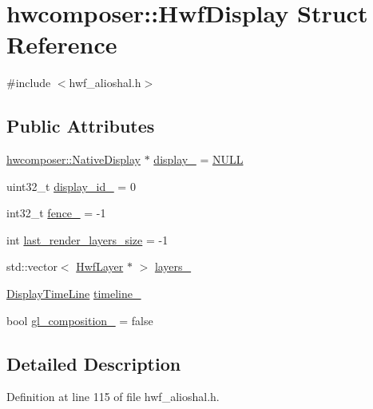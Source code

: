 \hypertarget{structhwcomposer_1_1HwfDisplay}{}\section{hwcomposer\+:\+:Hwf\+Display Struct Reference}
\label{structhwcomposer_1_1HwfDisplay}


{\ttfamily \#include $<$hwf\+\_\+alioshal.\+h$>$}

\subsection*{Public Attributes}
\begin{DoxyCompactItemize}
\item 
\mbox{\hyperlink{classhwcomposer_1_1NativeDisplay}{hwcomposer\+::\+Native\+Display}} $\ast$ \mbox{\hyperlink{structhwcomposer_1_1HwfDisplay_aa058badaba3f9338b59d1a7d5a892be1}{display\+\_\+}} = \mbox{\hyperlink{alios_2platformdefines_8h_a070d2ce7b6bb7e5c05602aa8c308d0c4}{N\+U\+LL}}
\item 
uint32\+\_\+t \mbox{\hyperlink{structhwcomposer_1_1HwfDisplay_a8f9fc339b8dbf1b3b2629cb00d5c2495}{display\+\_\+id\+\_\+}} = 0
\item 
int32\+\_\+t \mbox{\hyperlink{structhwcomposer_1_1HwfDisplay_a29f79393f69b80fb9e49b83fa20e74cf}{fence\+\_\+}} = -\/1
\item 
int \mbox{\hyperlink{structhwcomposer_1_1HwfDisplay_a96f9765d3366afea4a805eb1db9ba614}{last\+\_\+render\+\_\+layers\+\_\+size}} = -\/1
\item 
std\+::vector$<$ \mbox{\hyperlink{structhwcomposer_1_1HwfLayer}{Hwf\+Layer}} $\ast$ $>$ \mbox{\hyperlink{structhwcomposer_1_1HwfDisplay_a9fe68f49c093c79f0c5525f964c35239}{layers\+\_\+}}
\item 
\mbox{\hyperlink{classhwcomposer_1_1DisplayTimeLine}{Display\+Time\+Line}} \mbox{\hyperlink{structhwcomposer_1_1HwfDisplay_acf9eacafe04e405a33c36eeb5219a02a}{timeline\+\_\+}}
\item 
bool \mbox{\hyperlink{structhwcomposer_1_1HwfDisplay_ab546edf06ccbf05fd6bd299b650e0b40}{gl\+\_\+composition\+\_\+}} = false
\end{DoxyCompactItemize}


\subsection{Detailed Description}


Definition at line 115 of file hwf\+\_\+alioshal.\+h.



